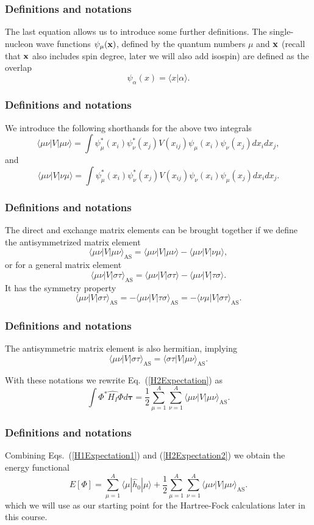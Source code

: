 \documentclass[compress]{beamer}
\begin{document}
\frame
{
  \frametitle{Definitions and notations}
\begin{small}
{\scriptsize
The last equation allows us to  introduce some further definitions.  
The single-nucleon wave functions $\psi_{\mu}({\bf x})$, defined by the quantum numbers $\mu$ and ${\bf x}$
(recall that ${\bf x}$ also includes spin degree, later we will also add isospin)   are defined as the overlap 
\[
   \psi_{\alpha}(x)  = \langle x | \alpha \rangle .
\]

}
\end{small}
}
\frame
{
  \frametitle{Definitions and notations}
\begin{small}
{\scriptsize
We introduce the following shorthands for the above two integrals
\[
\langle \mu\nu|V|\mu\nu\rangle =  \int \psi_{\mu}^*(x_i)\psi_{\nu}^*(x_j)V(x_{ij})\psi_{\mu}(x_i)\psi_{\nu}(x_j)
    dx_idx_j,
\]
and 
\[
\langle \mu\nu|V|\nu\mu\rangle = \int \psi_{\mu}^*(x_i)\psi_{\nu}^*(x_j)
  V(x_{ij})\psi_{\nu}(x_i)\psi_{\mu}(x_j)
  dx_idx_j.  
\]
}
\end{small}
}
\frame
{
  \frametitle{Definitions and notations}
\begin{small}
{\scriptsize
The direct and exchange matrix elements can be  brought together if we define the antisymmetrized matrix element
\[
\langle \mu\nu|V|\mu\nu\rangle_{\mathrm{AS}}= \langle \mu\nu|V|\mu\nu\rangle-\langle \mu\nu|V|\nu\mu\rangle,
\]
or for a general matrix element  
\[
\langle \mu\nu|V|\sigma\tau\rangle_{\mathrm{AS}}= \langle \mu\nu|V|\sigma\tau\rangle-\langle \mu\nu|V|\tau\sigma\rangle.
\]
It has the symmetry property
\[
\langle \mu\nu|V|\sigma\tau\rangle_{\mathrm{AS}}= -\langle \mu\nu|V|\tau\sigma\rangle_{\mathrm{AS}}=-\langle \nu\mu|V|\sigma\tau\rangle_{\mathrm{AS}}.
\]
}
\end{small}
}
\frame
{
  \frametitle{Definitions and notations}
\begin{small}
{\scriptsize
The antisymmetric matrix element is also hermitian, implying 
\[
\langle \mu\nu|V|\sigma\tau\rangle_{\mathrm{AS}}= \langle \sigma\tau|V|\mu\nu\rangle_{\mathrm{AS}}.
\]

With these notations we rewrite Eq.~(\ref{H2Expectation}) as 
\begin{equation}
  \int \Phi^*\hat{H_I}\Phi d\mathbf{\tau} 
  = \frac{1}{2}\sum_{\mu=1}^A\sum_{\nu=1}^A \langle \mu\nu|V|\mu\nu\rangle_{\mathrm{AS}}.
\label{H2Expectation2}
\end{equation}

}
\end{small}
}
\frame
{
  \frametitle{Definitions and notations}
\begin{small}
{\scriptsize
Combining Eqs.~(\ref{H1Expectation1}) and
(\ref{H2Expectation2}) we obtain the energy functional 
\begin{equation}
  E[\Phi] 
  = \sum_{\mu=1}^A \langle \mu | \hat{h}_0 | \mu \rangle +
  \frac{1}{2}\sum_{{\mu}=1}^A\sum_{{\nu}=1}^A \langle \mu\nu|V|\mu\nu\rangle_{\mathrm{AS}}.
\label{FunctionalEPhi}
\end{equation}
which we will use as our starting point for the Hartree-Fock calculations later in this course. 
}
\end{small}
}
\end{document}
